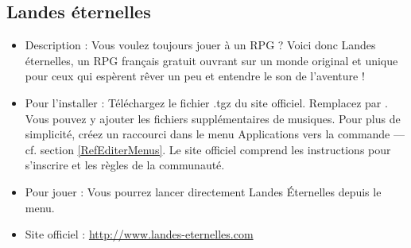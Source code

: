 \subsection{Landes éternelles}
\begin{itemize}
\begingroup
{}
\item Description : Vous voulez toujours jouer à un RPG ? Voici donc Landes éternelles, un RPG français gratuit ouvrant sur un monde original et unique pour ceux qui espèrent rêver un peu et entendre le son de l'aventure !{\par}
\endgroup
\item Pour l'installer : Téléchargez le fichier .tgz du site officiel. Remplacez  par . Vous pouvez y ajouter les fichiers supplémentaires de musiques. Pour plus de simplicité, créez un raccourci dans le menu Applications vers la commande  --- cf. section \ref{RefEditerMenus}. Le site officiel comprend les instructions pour s'inscrire et les règles de la communauté.{\par}
\item Pour jouer : Vous pourrez lancer directement Landes Éternelles depuis le menu.{\par}
\item Site officiel : \url{http://www.landes-eternelles.com}{\par}
\end{itemize}
